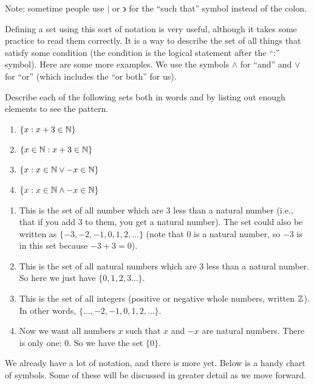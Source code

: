 \documentclass[12pt]{article}
\begin{document}
Note: sometime people use $|$ or $\backepsilon$ for the ``such that'' symbol instead of the colon.

Defining a set using this sort of notation is very useful, although it takes some practice to read them correctly.  It is a way to describe the set of all things that satisfy some condition (the condition is the logical statement after the ``:'' symbol).  Here are some more examples.  We use the symbols $\wedge$ for ``and'' and $\vee$ for ``or'' (which includes the ``or both'' for us).  

\begin{example}
Describe each of the following sets both in words and by listing out enough elements to see the pattern.

\begin{multicols}{2}
\begin{enumerate}
\item $\{x : x + 3 \in \mathbb N\}$
\item $\{x \in \mathbb N : x + 3 \in \mathbb N\}$
\item $\{x : x \in \mathbb N \vee -x \in \mathbb N\}$
\item $\{x : x \in \mathbb N \wedge -x \in \mathbb N\}$
\end{enumerate}
\end{multicols}

\begin{solution}
\begin{enumerate}
\item This is the set of all number which are 3 less than a natural number (i.e., that if you add 3 to them, you get a natural number).  The set could also be written as $\{-3, -2, -1, 0, 1, 2, \ldots\}$ (note that 0 is a natural number, so $-3$ is in this set because $-3 + 3 = 0$).
\item This is the set of all natural numbers which are 3 less than a natural number.  So here we just have $\{0, 1, 2,3 \ldots\}$. 
\item This is the set of all integers (positive or negative whole numbers, written $\mathbb Z$).  In other words, $\{\ldots, -2, -1, 0, 1, 2, \ldots\}$.  
\item Now we want all numbers $x$ such that $x$ and $-x$ are natural numbers.  There is only one: 0.  So we have the set $\{0\}$.
\end{enumerate}
\end{solution}
\end{example}


We already have a lot of notation, and there is more yet.  Below is a handy chart of symbols.  Some of these will be discussed in greater detail as we move forward.
\end{document}
